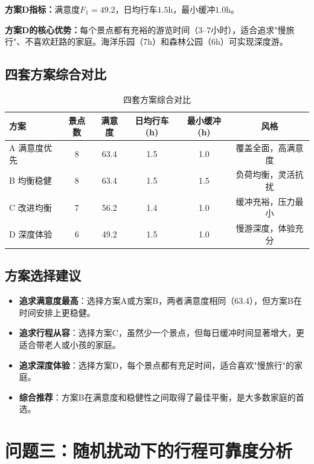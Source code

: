 \documentclass[12pt,a4paper]{ctexart}
\begin{document}
\textbf{方案D指标：}满意度$F_1 = 49.2$，日均行车$1.5$h，最小缓冲$1.0$h。

\textbf{方案D的核心优势：}每个景点都有充裕的游览时间（3--7小时），适合追求"慢旅行"、不喜欢赶路的家庭。海洋乐园（7h）和森林公园（6h）可实现深度游。

\subsection{四套方案综合对比}

\begin{table}[H]
\centering
\caption{四套方案综合对比}
\label{tab:compare}
\begin{tabular}{lccccc}
\toprule
\textbf{方案} & \textbf{景点数} & \textbf{满意度} & \textbf{日均行车(h)} & \textbf{最小缓冲(h)} & \textbf{风格} \\
\midrule
A 满意度优先 & 8 & 63.4 & 1.5 & 1.0 & 覆盖全面，高满意度 \\
B 均衡稳健 & 8 & 63.4 & 1.5 & 1.5 & 负荷均衡，灵活抗扰 \\
C 改进均衡 & 7 & 56.2 & 1.4 & 1.0 & 缓冲充裕，压力最小 \\
D 深度体验 & 6 & 49.2 & 1.5 & 1.0 & 慢游深度，体验充分 \\
\bottomrule
\end{tabular}
\end{table}

\subsection{方案选择建议}

\begin{itemize}
    \item \textbf{追求满意度最高}：选择方案A或方案B，两者满意度相同（63.4），但方案B在时间安排上更稳健。
    \item \textbf{追求行程从容}：选择方案C，虽然少一个景点，但每日缓冲时间显著增大，更适合带老人或小孩的家庭。
    \item \textbf{追求深度体验}：选择方案D，每个景点都有充足时间，适合喜欢"慢旅行"的家庭。
    \item \textbf{综合推荐}：方案B在满意度和稳健性之间取得了最佳平衡，是大多数家庭的首选。
\end{itemize}

\section{问题三：随机扰动下的行程可靠度分析}
\end{document}
